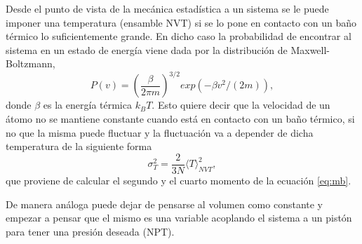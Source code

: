 Desde el punto de vista de la mecánica estadística a un sistema se le puede 
imponer una temperatura (ensamble NVT) si se lo pone en contacto con un baño 
térmico lo suficientemente grande. En dicho caso la probabilidad de encontrar al 
sistema en un estado de energía viene dada por la distribución de 
Maxwell-Boltzmann,
\begin{equation}\label{eq:mb}
    P(v) = \left( \frac{\beta}{2\pi m} \right)^{3/2} exp(-\beta v^2 / (2m)),
\end{equation}
donde $\beta$ es la energía térmica $k_B T$. Esto quiere decir que la velocidad 
de un átomo no se mantiene constante cuando está en contacto con un baño térmico, 
si no que la misma puede fluctuar y la fluctuación va a depender de dicha 
temperatura de la siguiente forma
\begin{equation}
    \sigma_T^2 = \frac{2}{3 N} \langle T \rangle_{NVT}^2,
\end{equation}
que proviene de calcular el segundo y el cuarto momento de la ecuación 
\ref{eq:mb}.

De manera análoga puede dejar de pensarse al volumen como constante y empezar a
pensar que el mismo es una variable acoplando el sistema a un pistón para tener
una presión deseada (NPT).

